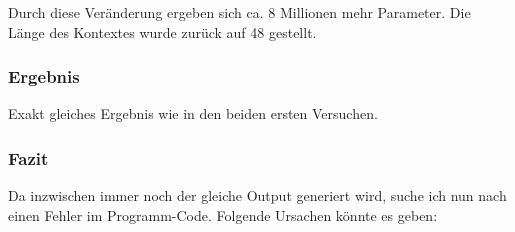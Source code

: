\documentclass[pdftex,a4paper,halfparskip, article]{scrartcl}
\begin{document}
Durch diese Veränderung ergeben sich ca. 8 Millionen mehr Parameter.
Die Länge des Kontextes wurde zurück auf 48 gestellt.

\subsubsection*{Ergebnis}

Exakt gleiches Ergebnis wie in den beiden ersten Versuchen.

\subsubsection*{Fazit}

Da inzwischen immer noch der gleiche Output generiert wird, suche ich nun nach einen Fehler im Programm-Code. Folgende Ursachen könnte es geben:
\end{document}
